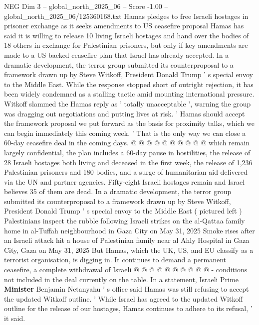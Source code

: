 \begin{textsample}{NEG Dim 3 – global\_north\_2025\_06 – Score -1.00 – global\_north\_2025\_06/125360168.txt}  \label{ex:f3_neg_352}
Hamas pledges to free Israeli hostages in prisoner exchange as it seeks amendments to US ceasefire proposal Hamas has said it is willing to release 10 living Israeli hostages and hand over the bodies of 18 others in exchange for Palestinian prisoners, but only if key amendments are made to a US-backed ceasefire plan that Israel has already accepted.
In a dramatic development, the terror group submitted its counterproposal to a framework drawn up by Steve Witkoff, President Donald Trump ' s special envoy to the Middle East.
While the response stopped short of outright rejection, it has been widely condemned as a stalling tactic amid mounting international pressure.
Witkoff slammed the Hamas reply as ' totally unacceptable ', warning the group was dragging out negotiations and putting lives at risk. ' Hamas should accept the framework proposal we put forward as the basis for proximity talks, which we can begin immediately this coming week. ' That is the only way we can close a 60-day ceasefire deal in the coming days. @ @ @ @ @ @ @ @ @ @ which remain largely confidential, the plan includes a 60-day pause in hostilities, the release of 28 Israeli hostages both living and deceased in the first week, the release of 1,236 Palestinian prisoners and 180 bodies, and a surge of humanitarian aid delivered via the UN and partner agencies.
Fifty-eight Israeli hostages remain and Israel believes 35 of them are dead.
In a dramatic development, the terror group submitted its counterproposal to a framework drawn up by Steve Witkoff, President Donald Trump ' s special envoy to the Middle East ( pictured left ) Palestinians inspect the rubble following Israeli strikes on the al-Qattaa family home in al-Tuffah neighbourhood in Gaza City on May 31, 2025 Smoke rises after an Israeli attack hit a house of Palestinian family near al Ahly Hospital in Gaza City, Gaza on May 31, 2025 But Hamas, which the UK, US, and EU classify as a terrorist organisation, is digging in.
It continues to demand a permanent ceasefire, a complete withdrawal of Israeli @ @ @ @ @ @ @ @ @ @ - conditions not included in the deal currently on the table.
In a statement, Israeli Prime \textbf{Minister} Benjamin Netanyahu ' s office said Hamas was still refusing to accept the updated Witkoff outline. ' While Israel has agreed to the updated Witkoff outline for the release of our hostages, Hamas continues to adhere to its refusal, ' it said.

\end{textsample}
